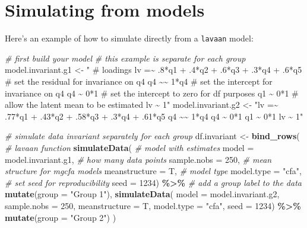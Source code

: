 \documentclass[
  man]{apa7}
\newenvironment{Shaded}{\begin{snugshade}}{\end{snugshade}}
\newcommand{\AttributeTok}[1]{\textcolor[rgb]{0.13,0.29,0.53}{#1}}
\newcommand{\CommentTok}[1]{\textcolor[rgb]{0.56,0.35,0.01}{\textit{#1}}}
\newcommand{\DecValTok}[1]{\textcolor[rgb]{0.00,0.00,0.81}{#1}}
\newcommand{\FunctionTok}[1]{\textcolor[rgb]{0.13,0.29,0.53}{\textbf{#1}}}
\newcommand{\NormalTok}[1]{#1}
\newcommand{\OtherTok}[1]{\textcolor[rgb]{0.56,0.35,0.01}{#1}}
\newcommand{\SpecialCharTok}[1]{\textcolor[rgb]{0.81,0.36,0.00}{\textbf{#1}}}
\newcommand{\StringTok}[1]{\textcolor[rgb]{0.31,0.60,0.02}{#1}}
\begin{document}
\hypertarget{simulating-from-models}{%
\section{Simulating from models}\label{simulating-from-models}}

Here's an example of how to simulate directly from a \texttt{lavaan} model:

\small

\begin{Shaded}
\begin{Highlighting}[]
\CommentTok{\# first build your model}
\CommentTok{\# this example is separate for each group}
\NormalTok{model.invariant.g1 }\OtherTok{\textless{}{-}} \StringTok{"}
\StringTok{\# loadings}
\StringTok{lv =\textasciitilde{} .8*q1 + .4*q2 + .6*q3 + .3*q4 + .6*q5 }
\StringTok{\# set the residual for invariance on q4}
\StringTok{q4 \textasciitilde{}\textasciitilde{} 1*q4}
\StringTok{\# set the intercept for invariance on q4}
\StringTok{q4 \textasciitilde{} 0*1}
\StringTok{\# set the intercept to zero for df purposes}
\StringTok{q1 \textasciitilde{} 0*1}
\StringTok{\# allow the latent mean to be estimated }
\StringTok{lv \textasciitilde{} 1"}
\NormalTok{model.invariant.g2 }\OtherTok{\textless{}{-}} \StringTok{"lv =\textasciitilde{} .77*q1 + .43*q2 + .58*q3 + .3*q4 + .61*q5}
\StringTok{q4 \textasciitilde{}\textasciitilde{} 1*q4}
\StringTok{q4 \textasciitilde{} 0*1}
\StringTok{q1 \textasciitilde{} 0*1}
\StringTok{lv \textasciitilde{} 1"}

\CommentTok{\# simulate data invariant separately for each group}
\NormalTok{df.invariant }\OtherTok{\textless{}{-}} \FunctionTok{bind\_rows}\NormalTok{(}
  \CommentTok{\# lavaan function }
  \FunctionTok{simulateData}\NormalTok{(}
    \CommentTok{\# model with estimates }
    \AttributeTok{model =}\NormalTok{ model.invariant.g1, }
    \CommentTok{\# how many data points}
    \AttributeTok{sample.nobs =} \DecValTok{250}\NormalTok{, }
    \CommentTok{\# mean structure for mgcfa models }
    \AttributeTok{meanstructure =}\NormalTok{ T, }
    \CommentTok{\# model type}
    \AttributeTok{model.type =} \StringTok{"cfa"}\NormalTok{,}
    \CommentTok{\# set seed for reproducibility }
    \AttributeTok{seed =} \DecValTok{1234}\NormalTok{) }\SpecialCharTok{\%\textgreater{}\%} 
    \CommentTok{\# add a group label to the data }
    \FunctionTok{mutate}\NormalTok{(}\AttributeTok{group =} \StringTok{"Group 1"}\NormalTok{), }
  \FunctionTok{simulateData}\NormalTok{(}
    \AttributeTok{model =}\NormalTok{ model.invariant.g2, }
    \AttributeTok{sample.nobs =} \DecValTok{250}\NormalTok{, }
    \AttributeTok{meanstructure =}\NormalTok{ T, }
    \AttributeTok{model.type =} \StringTok{"cfa"}\NormalTok{,}
    \AttributeTok{seed =} \DecValTok{1234}\NormalTok{) }\SpecialCharTok{\%\textgreater{}\%} 
    \FunctionTok{mutate}\NormalTok{(}\AttributeTok{group =} \StringTok{"Group 2"}\NormalTok{) }
\NormalTok{)}
\end{Highlighting}
\end{Shaded}
\end{document}
